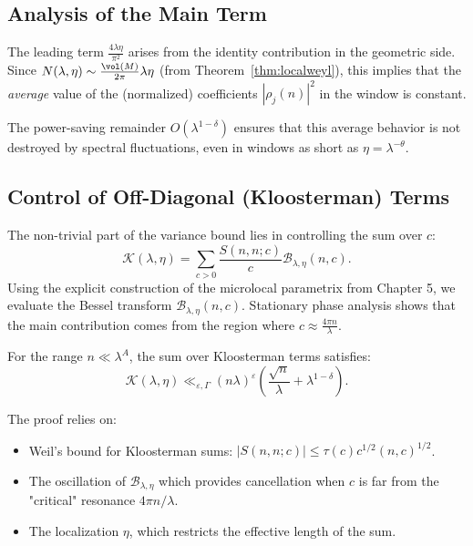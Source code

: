 \subsection{Analysis of the Main Term}

The leading term $\frac{4\lambda \eta}{\pi^2}$ arises from the identity contribution in the geometric side. Since $N(\lambda, \eta) \sim \frac{\vol(M)}{2\pi} \lambda \eta$ (from Theorem~\ref{thm:localweyl}), this implies that the \emph{average} value of the (normalized) coefficients $|\rho_j(n)|^2$ in the window is constant.

The power-saving remainder $O(\lambda^{1-\delta})$ ensures that this average behavior is not destroyed by spectral fluctuations, even in windows as short as $\eta = \lambda^{-\theta}$.


\subsection{Control of Off-Diagonal (Kloosterman) Terms}

The non-trivial part of the variance bound lies in controlling the sum over $c$:
\[
\mathcal{K}(\lambda, \eta) = \sum_{c > 0} \frac{S(n, n; c)}{c} \mathcal{B}_{\lambda, \eta}(n, c).
\]
Using the explicit construction of the microlocal parametrix from Chapter 5, we evaluate the Bessel transform $\mathcal{B}_{\lambda, \eta}(n, c)$. Stationary phase analysis shows that the main contribution comes from the region where $c \approx \frac{4\pi n}{\lambda}$.

\begin{proposition}\label{prop:kloosterman-bound}
For the range $n \ll \lambda^A$, the sum over Kloosterman terms satisfies:
\begin{equation}
\mathcal{K}(\lambda, \eta) \ll_{\varepsilon, \Gamma} (n\lambda)^\varepsilon \left( \frac{\sqrt{n}}{\lambda} + \lambda^{1-\delta} \right).
\end{equation}
\end{proposition}

The proof relies on:
\begin{itemize}
    \item Weil's bound for Kloosterman sums: $|S(n, n; c)| \le \tau(c) c^{1/2} (n, c)^{1/2}$.
    \item The oscillation of $\mathcal{B}_{\lambda, \eta}$ which provides cancellation when $c$ is far from the "critical" resonance $4\pi n / \lambda$.
    \item The localization $\eta$, which restricts the effective length of the sum.
\end{itemize}

